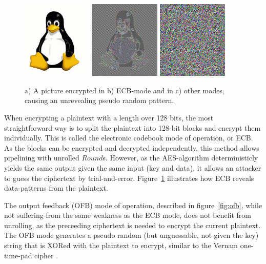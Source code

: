 \begin{figure}[htbb]
  \subfigure{\label{fig:ecbpicta}}
  \includegraphics[width=0.3\textwidth]{tux.jpeg}
  \subfigure{\label{fig:ecbpictb}}
  \includegraphics[width=0.3\textwidth]{tux_ecb.jpeg}
  \subfigure{\label{fig:ecbpictc}}
  \includegraphics[width=0.3\textwidth]{noise.png}
  \caption{a) A picture encrypted in b) ECB-mode and in c) other
    modes, causing an unrevealing pseudo random pattern.}
  \label{fig:ecbpict}
\end{figure}

When encrypting a plaintext with a length over 128 bits, the most
straightforward way is to split the plaintext into 128-bit blocks and
encrypt them individually. This is called the electronic codebook mode
of operation, or ECB. As the blocks can be encrypted and decrypted
independently, this method allows pipelining with unrolled
$Round$s. However, as the AES-algorithm deterministicly yields the
same output given the same input (key and data), it allows an attacker
to guess the ciphertext by trial-and-error. Figure~\ref{fig:ecbpict}
illustrates how ECB reveals data-patterns from the plaintext.

The output feedback (OFB) mode of operation, described in
figure~\ref{fig:ofb}, while not suffering from the same weakness as
the ECB mode, does not benefit from unrolling, as the preceeding
ciphertext is needed to encrypt the current plaintext. The OFB mode
generates a pseudo random (but unguessable, not given the key) string
that is XORed with the plaintext to encrypt, similar to the Vernam
one-time-pad cipher \cite{vernam}.

